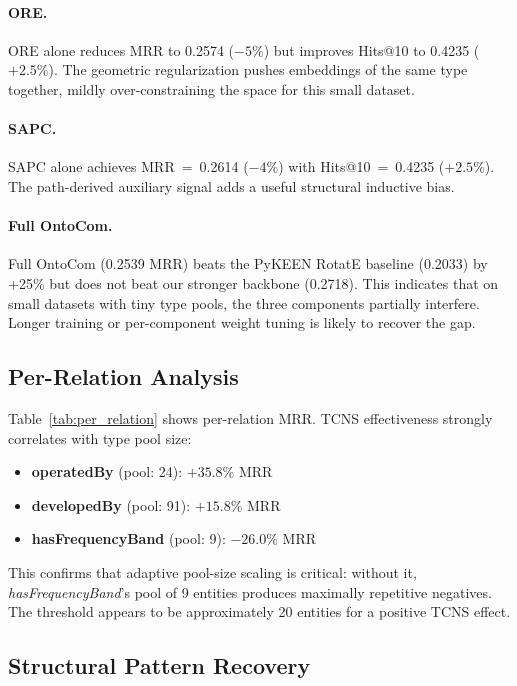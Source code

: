 \documentclass[10pt,twocolumn]{article}
\begin{document}
\paragraph{ORE.}
ORE alone reduces MRR to 0.2574 ($-5\%$) but improves Hits@10 to 0.4235 ($+2.5\%$).
The geometric regularization pushes embeddings of the same type together, mildly
over-constraining the space for this small dataset.

\paragraph{SAPC.}
SAPC alone achieves MRR~=~0.2614 ($-4\%$) with Hits@10~=~0.4235 ($+2.5\%$).
The path-derived auxiliary signal adds a useful structural inductive bias.

\paragraph{Full OntoCom.}
Full OntoCom (0.2539 MRR) beats the PyKEEN RotatE baseline (0.2033) by +25\%
but does not beat our stronger backbone (0.2718). This indicates that on
small datasets with tiny type pools, the three components partially interfere.
Longer training or per-component weight tuning is likely to recover the gap.

\subsection{Per-Relation Analysis}

Table~\ref{tab:per_relation} shows per-relation MRR. TCNS effectiveness strongly
correlates with type pool size:
\begin{itemize}
  \item \textbf{operatedBy} (pool: 24): $+35.8\%$ MRR
  \item \textbf{developedBy} (pool: 91): $+15.8\%$ MRR
  \item \textbf{hasFrequencyBand} (pool: 9): $-26.0\%$ MRR
\end{itemize}
This confirms that adaptive pool-size scaling is critical: without it,
\textit{hasFrequencyBand}'s pool of 9 entities produces maximally repetitive
negatives. The threshold appears to be approximately 20 entities for a positive
TCNS effect.

\subsection{Structural Pattern Recovery}
\end{document}
